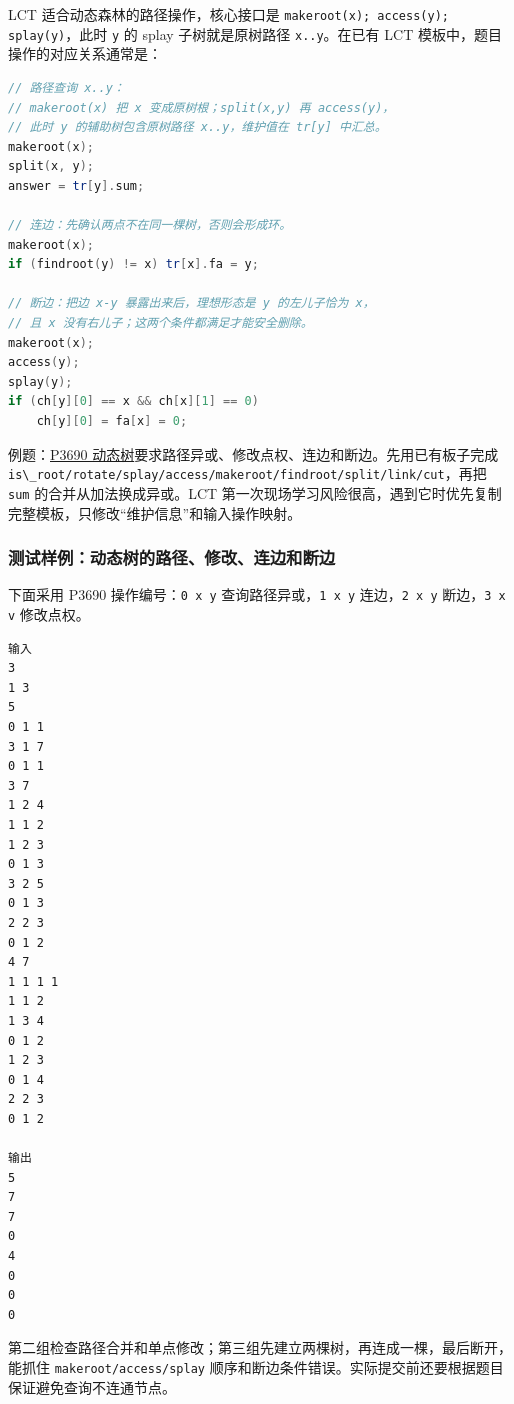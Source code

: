 LCT 适合动态森林的路径操作，核心接口是 \passthrough{\lstinline!makeroot(x); access(y); splay(y)!}，此时 \passthrough{\lstinline!y!} 的 splay 子树就是原树路径 \passthrough{\lstinline!x..y!}。在已有 LCT 模板中，题目操作的对应关系通常是：

\begin{lstlisting}[language={C++}]
// 路径查询 x..y：
// makeroot(x) 把 x 变成原树根；split(x,y) 再 access(y)，
// 此时 y 的辅助树包含原树路径 x..y，维护值在 tr[y] 中汇总。
makeroot(x);
split(x, y);
answer = tr[y].sum;

// 连边：先确认两点不在同一棵树，否则会形成环。
makeroot(x);
if (findroot(y) != x) tr[x].fa = y;

// 断边：把边 x-y 暴露出来后，理想形态是 y 的左儿子恰为 x，
// 且 x 没有右儿子；这两个条件都满足才能安全删除。
makeroot(x);
access(y);
splay(y);
if (ch[y][0] == x && ch[x][1] == 0)
    ch[y][0] = fa[x] = 0;
\end{lstlisting}

例题：\href{https://www.luogu.com.cn/problem/P3690}{P3690 动态树}要求路径异或、修改点权、连边和断边。先用已有板子完成 \passthrough{\lstinline!is\_root/rotate/splay/access/makeroot/findroot/split/link/cut!}，再把 \passthrough{\lstinline!sum!} 的合并从加法换成异或。LCT 第一次现场学习风险很高，遇到它时优先复制完整模板，只修改``维护信息''和输入操作映射。

\subsubsection{测试样例：动态树的路径、修改、连边和断边}

下面采用 P3690 操作编号：\passthrough{\lstinline!0 x y!} 查询路径异或，\passthrough{\lstinline!1 x y!} 连边，\passthrough{\lstinline!2 x y!} 断边，\passthrough{\lstinline!3 x v!} 修改点权。

\begin{lstlisting}
输入
3
1 3
5
0 1 1
3 1 7
0 1 1
3 7
1 2 4
1 1 2
1 2 3
0 1 3
3 2 5
0 1 3
2 2 3
0 1 2
4 7
1 1 1 1
1 1 2
1 3 4
0 1 2
1 2 3
0 1 4
2 2 3
0 1 2

输出
5
7
7
0
4
0
0
0
\end{lstlisting}

第二组检查路径合并和单点修改；第三组先建立两棵树，再连成一棵，最后断开，能抓住 \passthrough{\lstinline!makeroot/access/splay!} 顺序和断边条件错误。实际提交前还要根据题目保证避免查询不连通节点。
